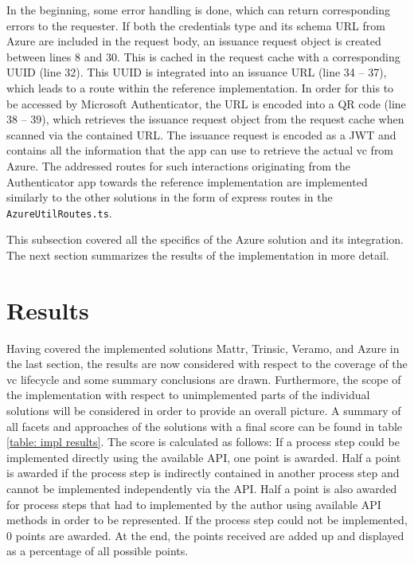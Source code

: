     In the beginning, some error handling is done, which can return corresponding errors to the requester. If both the credentials type and its schema URL from Azure are included in the request body, an issuance request object is created between lines 8 and 30. This is cached in the request cache with a corresponding UUID (line 32). This UUID is integrated into an issuance URL (line 34 – 37), which leads to a route within the reference implementation. In order for this to be accessed by Microsoft Authenticator, the URL is encoded into a QR code (line 38 – 39), which retrieves the issuance request object from the request cache when scanned via the contained URL. The issuance request is encoded as a JWT and contains all the information that the app can use to retrieve the actual \ac{vc} from Azure. The addressed routes for such interactions originating from the Authenticator app towards the reference implementation are implemented similarly to the other solutions in the form of express routes in the \texttt{AzureUtilRoutes.ts}.
    
    This subsection covered all the specifics of the Azure solution and its integration. The next section summarizes the results of the implementation in more detail.

    \section{Results}\label{section: ri-results}
    
    Having covered the implemented solutions Mattr, Trinsic, Veramo, and Azure in the last section, the results are now considered with respect to the coverage of the \ac{vc} lifecycle and some summary conclusions are drawn. Furthermore, the scope of the implementation with respect to unimplemented parts of the individual solutions will be considered in order to provide an overall picture. A summary of all facets and approaches of the solutions with a final score can be found in table \ref{table: impl results}. The score is calculated as follows: If a process step could be implemented directly using the available API, one point is awarded. Half a point is awarded if the process step is indirectly contained in another process step and cannot be implemented independently via the API. Half a point is also awarded for process steps that had to implemented by the author using available API methods in order to be represented. If the process step could not be implemented, 0 points are awarded. At the end, the points received are added up and displayed as a percentage of all possible points.
    
